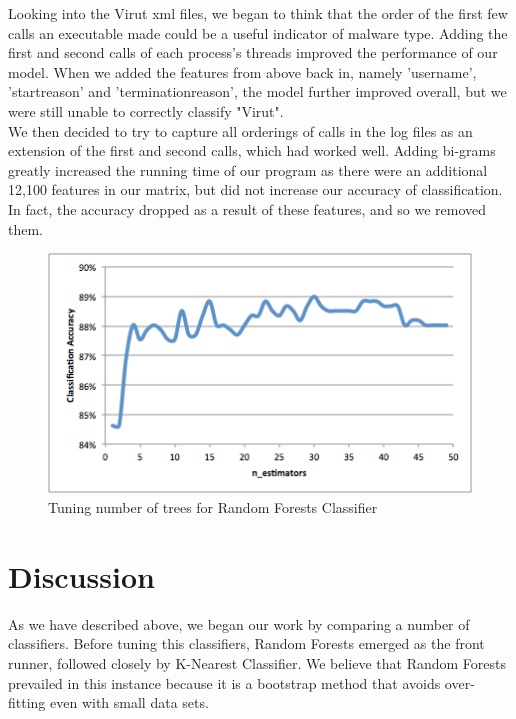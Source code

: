 \documentclass[11pt]{article}
\begin{document}
Looking into the Virut xml files, we began to think that the order of the first few calls an executable made could be a useful indicator of malware type. Adding the first and second calls of each process's threads improved the performance of our model. When we added the features from above back in, namely 'username', 'startreason' and 'terminationreason', the model further improved overall, but we were still unable to correctly classify "Virut". \\

We then decided to try to capture all orderings of calls in the log files as an extension of the first and second calls, which had worked well.  Adding bi-grams greatly increased the running time of our program as there were an additional 12,100 features in our matrix, but did not increase our accuracy of classification.  In fact, the accuracy dropped as a result of these features, and so we removed them.

\begin{figure}[t]
\centering
\includegraphics[width=12cm]{n_estimators_tuning}
\caption{Tuning number of trees for Random Forests Classifier}
\label{fig:n_estimators_tuning}

\end{figure}

\section{Discussion}

As we have described above, we began our work by comparing a number of classifiers.  Before tuning this classifiers, Random Forests emerged as the front runner, followed closely by K-Nearest Classifier.  We believe that Random Forests prevailed in this instance because it is a bootstrap method that avoids over-fitting even with small data sets.\\
\end{document}

